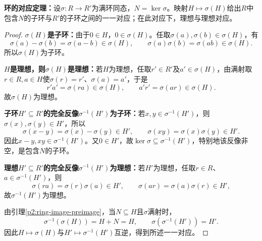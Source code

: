 \begin{theorem}\label{p2:ring-correspondence}
\textbf{环的对应定理：}设$\sigma:R\to R'$为满环同态，$N=\ker\sigma$。映射$H\mapsto\sigma(H)$给出$R$中包含$N$的子环与$R'$的子环之间的一一对应；在此对应下，理想与理想对应。
\end{theorem}
\begin{proof}
\textbf{$\sigma(H)$是子环：}由于$0\in H$，$0\in\sigma(H)$。任取$\sigma(a),\sigma(b)\in\sigma(H)$，有
\[
\sigma(a)-\sigma(b)=\sigma(a-b)\in\sigma(H),\qquad
\sigma(a)\sigma(b)=\sigma(ab)\in\sigma(H).
\]
所以$\sigma(H)$为子环。

\textbf{$H$是理想，则$\sigma(H)$是理想：}若$H$为理想，任取$r'\in R'$及$a'\in\sigma(H)$，由满射取$r\in R,a\in H$使$\sigma(r)=r'$、$\sigma(a)=a'$，于是
\[
r'a'=\sigma(ra)\in\sigma(H),\qquad a'r'=\sigma(ar)\in\sigma(H).
\]
故$\sigma(H)$为理想。

\textbf{子环$H'\subseteq R'$的完全反像$\sigma^{-1}(H')$为子环：}若$x,y\in\sigma^{-1}(H')$，则$\sigma(x),\sigma(y)\in H'$，所以
\[
\sigma(x-y)=\sigma(x)-\sigma(y)\in H',\qquad
\sigma(xy)=\sigma(x)\sigma(y)\in H'.
\]
因此$x-y,xy\in\sigma^{-1}(H')$。又$0\in H'$，故$\ker\sigma\subseteq\sigma^{-1}(H')$，特别地该反像非空，是包含$N$的子环。

\textbf{理想$H'\subseteq R'$的完全反像$\sigma^{-1}(H')$为理想：}若$H'$为理想，任取$r\in R$、$a\in\sigma^{-1}(H')$，则
\[
\sigma(ra)=\sigma(r)\sigma(a)\in H',\qquad
\sigma(ar)=\sigma(a)\sigma(r)\in H',
\]
故$\sigma^{-1}(H')$为理想。

由引理\ref{p2:ring-image-preimage}，当$N\subseteq H$且$\sigma$满射时，
\[
\sigma^{-1}(\sigma(H))=H+N=H,\qquad
\sigma(\sigma^{-1}(H'))=H'.
\]
因此$H\mapsto\sigma(H)$与$H'\mapsto\sigma^{-1}(H')$互逆，得到所述一一对应。
\end{proof}

